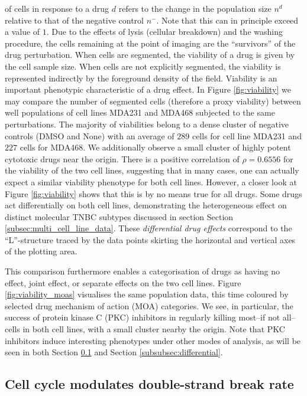 of cells in response to a drug $d$ refers to the change in the population size $n^d$ relative to that of the negative control $n^-$. Note that this can in principle exceed a value of $1$. Due to the effects of lysis (cellular breakdown) and the washing procedure, the cells remaining at the point of imaging are the ``survivors'' of the drug perturbation. When cells are segmented, the viability of a drug is given by the cell sample size. When cells are not explicitly segmented, the viability is represented indirectly by the foreground density of the field. Viability is an important phenotypic characteristic of a drug effect. In Figure \ref{fig:viability} we may compare the number of segmented cells (therefore a proxy viability) between well populations of cell lines MDA231 and MDA468 subjected to the same perturbations. The majority of viabilities belong to a dense cluster of negative controls (DMSO and None) with an average of $289$ cells for cell line MDA231 and $227$ cells for MDA468. We additionally observe a small cluster of highly potent cytotoxic drugs near the origin. There is a positive correlation of $\rho = 0.6556$ for the viability of the two cell lines, suggesting that in many cases, one can actually expect a similar viability phenotype for both cell lines. However, a closer look at Figure \ref{fig:viability} shows that this is by no means true for all drugs. Some drugs act differentially on both cell lines, demonstrating the heterogeneous effect on distinct molecular TNBC subtypes discussed in section Section \ref{subsec:multi_cell_line_data}. These \emph{differential drug effects} correspond to the ``L''-structure traced by the data points skirting the horizontal and vertical axes of the plotting area.

This comparison furthermore enables a categorisation of drugs as having no effect, joint effect, or separate effects on the two cell lines. Figure \ref{fig:viability_moas} visualises the same population data, this time coloured by selected drug mechanism of action (MOA) categories. We see, in particular, the success of protein kinase C (PKC) inhibitors in regularly killing most--if not all--cells in both cell lines, with a small cluster nearby the origin. Note that PKC inhibitors induce interesting phenotypes under other modes of analysis, as will be seen in both Section \ref{subsec:multivariate} and Section \ref{subsubsec:differential}.

\subsection{Cell cycle modulates double-strand break rate}
\label{subsec:multivariate}

